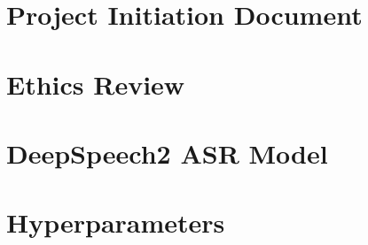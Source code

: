 \appendix


\chapter{Project Initiation Document}




\chapter{Ethics Review}



\chapter{DeepSpeech2 ASR Model}



\chapter{Hyperparameters}

